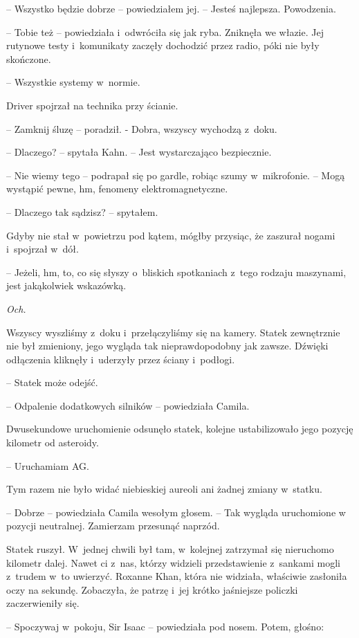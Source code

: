 \documentclass[oneside,polish,12pt,sfheadings]{mwbk}
\begin{document}
-- Wszystko będzie dobrze -- powiedziałem jej. -- Jesteś najlepsza.
Powodzenia.

-- Tobie też -- powiedziała i~odwróciła się jak ryba. Zniknęła we włazie.
Jej rutynowe testy i~komunikaty zaczęły dochodzić przez radio, póki nie
były skończone.

-- Wszystkie systemy w~normie.

Driver spojrzał na technika przy ścianie. 

-- Zamknij śluzę -- poradził. -
Dobra, wszyscy wychodzą z~doku.

-- Dlaczego? -- spytała Kahn. -- Jest wystarczająco bezpiecznie.

-- Nie wiemy tego -- podrapał się po gardle, robiąc szumy w~mikrofonie. --
Mogą wystąpić pewne, hm, fenomeny elektromagnetyczne.

-- Dlaczego tak sądzisz? -- spytałem.

Gdyby nie stał w~powietrzu pod kątem, mógłby przysiąc, że zaszurał
nogami i~spojrzał w~dół.

-- Jeżeli, hm, to, co się słyszy o~bliskich spotkaniach z~tego rodzaju
maszynami, jest jakąkolwiek wskazówką.

\emph{Och.}

Wszyscy wyszliśmy z~doku i~przełączyliśmy się na kamery. Statek
zewnętrznie nie był zmieniony, jego wygląda tak nieprawdopodobny jak
zawsze. Dźwięki odłączenia kliknęły i~uderzyły przez ściany i~podłogi.

-- Statek może odejść.

-- Odpalenie dodatkowych silników -- powiedziała Camila.

Dwusekundowe uruchomienie odsunęło statek, kolejne ustabilizowało jego
pozycję kilometr od asteroidy.

-- Uruchamiam AG.

Tym razem nie było widać niebieskiej aureoli ani żadnej zmiany w~statku.

-- Dobrze -- powiedziała Camila wesołym głosem. -- Tak wygląda uruchomione
w pozycji neutralnej. Zamierzam przesunąć naprzód.

Statek ruszył. W~jednej chwili był tam, w~kolejnej zatrzymał się
nieruchomo kilometr dalej. Nawet ci z~nas, którzy widzieli
przedstawienie z~sankami mogli z~trudem w~to uwierzyć. Roxanne Khan,
która nie widziała, właściwie zasłoniła oczy na sekundę. Zobaczyła, że
patrzę i~jej krótko jaśniejsze policzki zaczerwieniły się.

-- Spoczywaj w~pokoju, Sir Isaac -- powiedziała pod nosem. Potem, głośno:
\end{document}
